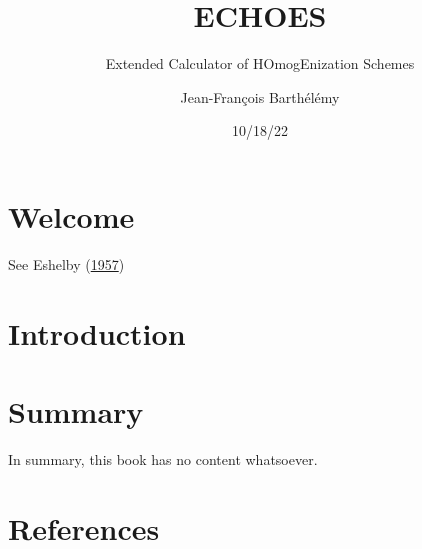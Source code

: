\documentclass[
  letterpaper,
  DIV=11,
  numbers=noendperiod]{scrreprt}
\title{ECHOES}
\subtitle{Extended Calculator of HOmogEnization Schemes}
\author{Jean-François Barthélémy}
\date{10/18/22}
\renewcommand*\contentsname{Table of contents}
\newcommand\contentsname{Table of contents}
\begin{document}
\maketitle
\renewcommand*\contentsname{Table of contents}
{
\hypersetup{linkcolor=}
\setcounter{tocdepth}{2}
\tableofcontents
}

\hypertarget{welcome}{%
\chapter*{Welcome}\label{welcome}}


See Eshelby (\protect\hyperlink{ref-eshelby1957}{1957})


\hypertarget{introduction}{%
\chapter{Introduction}\label{introduction}}


\hypertarget{summary}{%
\chapter{Summary}\label{summary}}

In summary, this book has no content whatsoever.


\hypertarget{references}{%
\chapter*{References}\label{references}}

\end{document}
